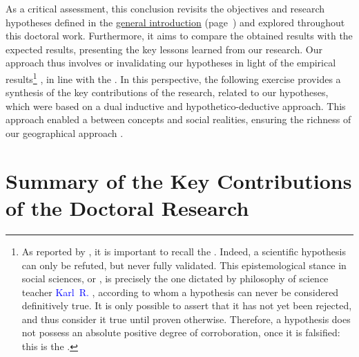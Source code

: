 \begin{refsegment}
As a critical assessment, this conclusion revisits the objectives and research hypotheses defined in the \hyperref[body:introduction-generale]{general introduction} (page~\pageref{body:introduction-generale}) and explored throughout this doctoral work. Furthermore, it aims to compare the obtained results with the expected results, presenting the key lessons learned from our research. Our approach thus involves  or invalidating our hypotheses in light of the empirical results\footnote{
    As reported by \textcolor{blue}{\textcite[44]{tomini_methodes_2020}}, it is important to recall the . Indeed, a scientific hypothesis can only be refuted, but never fully validated. This epistemological stance in social sciences, or  \textcolor{blue}{\autocite[303]{baraquin_popper_2020}}, is precisely the one dictated by philosophy of science teacher \textcolor{blue}{Karl~R.} \textcolor{blue}{\textcite[273]{popper_logique_1973}}, according to whom a hypothesis can never be considered definitively true. It is only possible to assert that it has not yet been rejected, and thus consider it true until proven otherwise. Therefore, a hypothesis does not possess an absolute positive degree of corroboration, once it is falsified: this is the .
} \textcolor{blue}{\autocite[44]{tomini_methodes_2020}}, in line with the  \textcolor{blue}{\autocite[273]{popper_logique_1973}}. In this perspective, the following exercise provides a synthesis of the key contributions of the research, related to our hypotheses, which were based on a dual inductive and hypothetico-deductive approach. This approach enabled a  between concepts and social realities, ensuring the richness of our geographical approach \textcolor{blue}{\autocite[24]{ageron_intermodalite-voyageurs_2013}}.%

    \newpage
\section*{Summary of the Key Contributions of the Doctoral Research
    \label{conclusion-generale:principaux-apports}
    }


\end{refsegment}
